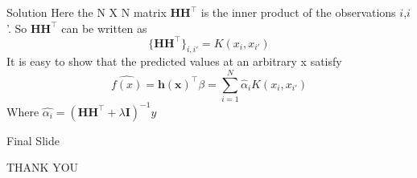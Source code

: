\documentclass{beamer}
\begin{document}
\begin{frame}{Solution}
Here the N X N matrix $\mathbf{HH}^\intercal$ is the inner product of the observations $i$,$i$'.
So $\mathbf{HH}^\intercal$ can be written as
\begin{equation}
\{ \mathbf{HH}^\intercal \}_{ i , i' } = K(x_{i},x_{i'})    
\end{equation}
It is easy to show that the predicted values at an arbitrary x satisfy
\begin{equation}
    \hat{f(x)} = \mathbf{h(x)}^\intercal \beta
               = \sum_{i=1}^{N} \hat{\alpha}_{i} K(x_{i},x_{i'})
\end{equation}
Where $\hat{\alpha_{i}} =  {(\mathbf{H}\mathbf{H}^\intercal + \lambda\mathbf{I})}^{-1} y $

\end{frame}

 
\begin{frame}{Final Slide}
\begin{center}
    THANK YOU
\end{center}
    
\end{frame}
    
\end{document}

